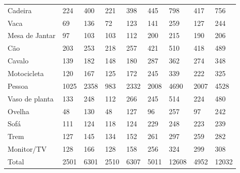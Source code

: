 \begin{table}[H]
\begin{tabular}{l|l|l|l|l|l|l|ll}
		Cadeira        & 224          & 400          & 221            & 398           & 445               & 798               & \multicolumn{1}{l|}{417}     & 756     \\
		Vaca           & 69           & 136          & 72             & 123           & 141               & 259               & \multicolumn{1}{l|}{127}     & 244     \\
		Mesa de Jantar & 97           & 103          & 103            & 112           & 200               & 215               & \multicolumn{1}{l|}{190}     & 206     \\
		Cão            & 203          & 253          & 218            & 257           & 421               & 510               & \multicolumn{1}{l|}{418}     & 489     \\
		Cavalo         & 139          & 182          & 148            & 180           & 287               & 362               & \multicolumn{1}{l|}{274}     & 348     \\
		Motocicleta    & 120          & 167          & 125            & 172           & 245               & 339               & \multicolumn{1}{l|}{222}     & 325     \\
		Pessoa         & 1025         & 2358         & 983            & 2332          & 2008              & 4690              & \multicolumn{1}{l|}{2007}    & 4528    \\
		Vaso de planta & 133          & 248          & 112            & 266           & 245               & 514               & \multicolumn{1}{l|}{224}     & 480     \\
		Ovelha         & 48           & 130          & 48             & 127           & 96                & 257               & \multicolumn{1}{l|}{97}      & 242     \\
		Sofá           & 111          & 124          & 118            & 124           & 229               & 248               & \multicolumn{1}{l|}{223}     & 239     \\
		Trem           & 127          & 145          & 134            & 152           & 261               & 297               & \multicolumn{1}{l|}{259}     & 282     \\
		Monitor/TV     & 128          & 166          & 128            & 158           & 256               & 324               & \multicolumn{1}{l|}{299}     & 308     \\
		Total          & 2501         & 6301         & 2510           & 6307          & 5011              & 12608             & \multicolumn{1}{l|}{4952}    & 12032  
	\end{tabular}
	\\
\end{table}

